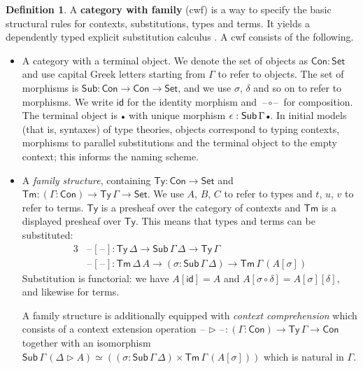 \documentclass[12pt,a4paper,twoside,openany]{book}
\theoremstyle{remark}
\theoremstyle{definition}
\newtheorem{mydefinition}{Definition}
\theoremstyle{theorem}
\newcommand{\id}{\mathsf{id}}
\newcommand{\Con}{\mathsf{Con}}
\newcommand{\Sub}{\mathsf{Sub}}
\newcommand{\Tm}{\mathsf{Tm}}
\newcommand{\Ty}{\mathsf{Ty}}
\newcommand{\blank}{\mathord{\hspace{1pt}\text{--}\hspace{1pt}}}
\newcommand{\Set}{\mathsf{Set}}
\newcommand{\ext}{\triangleright}
\newcommand{\emptycon}{\scaleobj{.75}\bullet}
\begin{document}
\begin{mydefinition}
A \textbf{category with family} (cwf) \cite{Dybjer96internaltype} is a way to
specify the basic structural rules for contexts, substitutions, types and
terms. It yields a dependently typed explicit substitution calculus \cite{TODO}.
A cwf consists of the following.
\begin{itemize}
\item
  A category with a terminal object. We denote the set of objects as $\Con :
  \Set$ and use capital Greek letters starting from $\Gamma$ to refer to
  objects. The set of morphisms is $\Sub : \Con \to \Con \to \Set$, and we use
  $\sigma$, $\delta$ and so on to refer to morphisms. We write $\id$ for the
  identity morphism and $\blank\circ\blank$ for composition. The terminal
  object is $\emptycon$ with unique morphism $\epsilon :
  \Sub\,\Gamma\,\emptycon$. In initial models (that is, syntaxes) of type
  theories, objects correspond to typing contexts, morphisms to parallel
  substitutions and the terminal object to the empty context; this informs the
  naming scheme.
\item A \emph{family structure}, containing $\Ty : \Con \to \Set$ and $\Tm :
  (\Gamma : \Con) \to \Ty\,\Gamma \to \Set$. We use $A$, $B$, $C$ to refer to
  types and $t$, $u$, $v$ to refer to terms. $\Ty$ is a presheaf over the
  category of contexts and $\Tm$ is a displayed presheaf over $\Ty$. This means
  that types and terms can be substituted:
  \begin{alignat*}{3}
    &\blank[\blank] : \Ty\,\Delta \to \Sub\,\Gamma\,\Delta \to \Ty\,\Gamma\\
    &\blank[\blank] : \Tm\,\Delta\,A \to (\sigma : \Sub\,\Gamma\,\Delta) \to \Tm\,\Gamma\,(A[\sigma])
  \end{alignat*}
  Substitution is functorial: we have $A[\id] = A$ and
  $A[\sigma\circ\delta] = A[\sigma][\delta]$, and likewise for terms.

  A family structure is additionally equipped with \emph{context comprehension}
  which consists of a context extension operation $\blank\ext\blank : (\Gamma :
  \Con) \to \Ty\,\Gamma \to \Con$ together with an isomorphism
  $\Sub\,\Gamma\,(\Delta\ext A) \simeq ((\sigma : \Sub\,\Gamma\,\Delta) \times
  \Tm\,\Gamma\,(A[\sigma]))$ which is natural in $\Gamma$.
\end{itemize}
\end{mydefinition}
\end{document}
